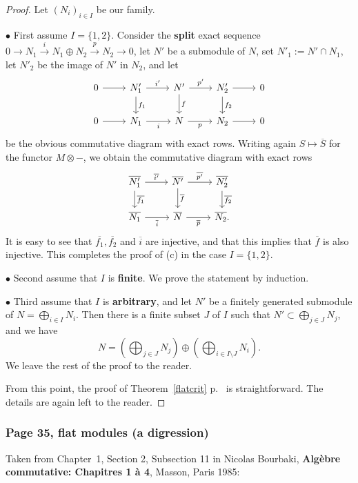 \documentclass[12pt,letterpaper]{article}%
\newcommand{\bu}{\bullet}
\newcommand{\nn}{\noindent}
\begin{document}
\begin{proof} 
Let $(N_i)_{i\in I}$ be our family. 

\nn$\bu$ First assume $I=\{1,2\}$. Consider the \textbf{split} exact sequence $0\to N_1\xrightarrow i N_1\oplus N_2\xrightarrow pN_2\to0$, let $N'$ be a submodule of $N$, set $N'_1:=N'\cap N_1$, let $N'_2$ be the image of $N'$ in $N_2$, and let 
$$
\begin{tikzcd}
0\ar[r]&N'_1\ar[d,"f_1"]\ar[r,"i'"]&N'\ar[d,"f"]\ar[r,"p'"]&N'_2\ar[d,"f_2"]\ar[r]&0\\ 
0\ar[r]&N_1\ar[r,"i"']&N\ar[r,"p"']&N_2\ar[r]&0
\end{tikzcd}
$$  
be the obvious commutative diagram with exact rows. Writing again $S\mapsto\overline S$ for the functor $M\otimes-$, we obtain the commutative diagram with exact rows
$$
\begin{tikzcd}
\overline{N'_1}\ar[d,"\overline{f_1}"]\ar[r,"\overline{i'}"]&\overline{N'}\ar[d,"\overline f"]\ar[r,"\overline{p'}"]& \overline{N'_2}\ar[d,"\overline{f_2}"]\\ 
\overline{N_1}\ar[r,"\overline i"']&\overline N\ar[r,"\overline p"']& \overline{N_2}.
\end{tikzcd}
$$ 
It is easy to see that $\overline{f_1},\overline{f_2}$ and $\overline i$ are injective, and that this implies that $\overline f$ is also injective. This completes the proof of (c) in the case $I=\{1,2\}$.

\nn$\bu$ Second assume that $I$ is \textbf{finite}. We prove the statement by induction.

\nn$\bu$ Third assume that $I$ is \textbf{arbitrary}, and let $N'$ be a finitely generated submodule of $N=\bigoplus_{i\in I}N_i$. Then there is a finite subset $J$ of $I$ such that $N'\subset\bigoplus_{j\in J}N_j$, and we have 
$$
N=\left(\bigoplus_{j\in J}N_j\right)\oplus\left(\bigoplus_{i\in I\setminus J}N_i\right). 
$$ 
We leave the rest of the proof to the reader.

From this point, the proof of Theorem~\ref{flatcrit} p.~\pageref{flatcrit} is straightforward. The details are again left to the reader.

\end{proof}

\subsubsection{Page 35, flat modules (a digression)}%

Taken from Chapter~1, Section 2, Subsection 11 in Nicolas Bourbaki, \textbf{Algèbre commutative: Chapitres 1 à 4}, Masson, Paris 1985:
\end{document}
